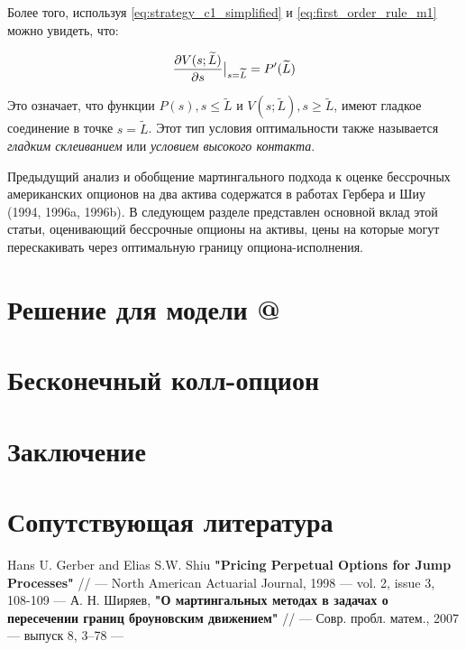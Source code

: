 \documentclass[a4paper,12pt]{article}
\makeatletter
\theoremstyle{definition}
\newcommand*{\rom}[1]{\expandafter\@slowromancap\romannumeral #1@}
\newcommand{\at}[2][]{#1|_{#2}}
\makeatother
\begin{document}
Более того, используя \eqref{eq:strategy_c1_simplified} и \eqref{eq:first_order_rule_m1} можно увидеть, что:

\begin{equation}\label{eq:smooth_pasting_condition_m1}
    \pdv{V(s; \widetilde{L})}{s}\at[\big]{s=\widetilde{L}} = P'(\widetilde{L})
\end{equation}

Это означает, что функции $P(s), s \le \widetilde{L}$ и $V(s; \widetilde{L}), s \ge \widetilde{L}$, имеют гладкое соединение в точке $s = \widetilde{L}$. Этот тип условия оптимальности также называется \textit{гладким склеиванием} или \textit{условием высокого контакта}.

Предыдущий анализ и обобщение мартингального подхода к оценке бессрочных американских опционов на два актива содержатся в работах Гербера и Шиу
(1994, 1996a, 1996b). В следующем разделе представлен
основной вклад этой статьи, оценивающий бессрочные опционы на активы, цены на которые могут перескакивать через оптимальную границу опциона-исполнения.

\section{Решение для модели \rom{2}}

\section{Бесконечный колл-опцион}

\section{Заключение}

\section{Сопутствующая литература}

\begin{thebibliography}{3}
Hans U. Gerber and Elias S.W. Shiu \textbf{"Pricing Perpetual Options for Jump Processes"} // --- North American Actuarial Journal, 1998 --- vol. 2, issue 3, 108-109 ---
А. Н. Ширяев, \textbf{"О мартингальных методах в задачах о пересечении границ броуновским движением"} // --- Совр. пробл. матем., 2007 --- выпуск 8, 3–78 ---
\end{thebibliography}
\end{document}
